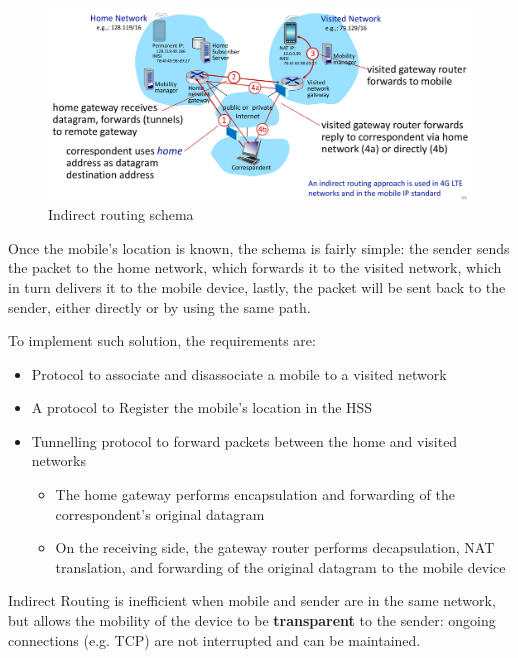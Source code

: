 \begin{figure}[htbp]
   \centering
   \includegraphics{images/mn_indirect.png}
   \caption{Indirect routing schema}
   \label{fig:mn_indirect}
\end{figure}

Once the mobile's location is known, the schema is fairly simple:
the sender sends the packet to the home network, which forwards it to the visited network, which in turn delivers it to the mobile device, lastly, the packet will be sent back to the sender, either directly or by using the same path.

To implement such solution, the requirements are:
\begin{itemize}
   \item Protocol to associate and disassociate a mobile to a visited network
   \item A protocol to Register the mobile's location in the HSS
   \item Tunnelling protocol to forward packets between the home and visited networks
   \begin{itemize}
      \item The home gateway performs encapsulation and forwarding of the correspondent’s original datagram
      \item On the receiving side, the gateway router performs decapsulation, NAT translation, and forwarding of the original datagram to the mobile device
   \end{itemize}
   
\end{itemize}

Indirect Routing is inefficient when mobile and sender are in the same network, but allows the mobility of the device to be \textbf{transparent} to the sender: ongoing connections (e.g. TCP) are not interrupted and can be maintained.

